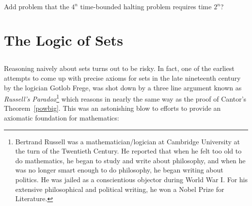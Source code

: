 \begin{problems}

\classproblems
{}

\homeworkproblems
{}

\begin{editingnotes}
Add problem that the $4^n$ time-bounded halting problem requires time
$2^n$?
\end{editingnotes}

\examproblems
{}

\end{problems}

\section{The Logic of Sets}\label{set_logic_sec}%

\subsection{}

Reasoning naively about sets turns out to be risky.  In fact, one of the
earliest attempts to come up with precise axioms for sets in the late
nineteenth century by the logician  Gotlob Frege, was
shot down by a three line argument known as \emph{Russell's
  Paradox}\footnote{Bertrand Russell%
was a mathematician/logician at Cambridge University at the turn of the Twentieth
 Century.  He reported that when he felt too old to do mathematics, he began to study
  and write about philosophy, and when he was no longer smart enough to do
  philosophy, he began writing about politics.  He was jailed as a
  conscientious objector during World War I.  For his extensive
  philosophical and political writing, he won a Nobel Prize for
  Literature.} which reasons in nearly the same way as the proof of
Cantor's Theorem~\ref{powbig}.  This was an astonishing blow to efforts to
provide an axiomatic foundation for mathematics:


